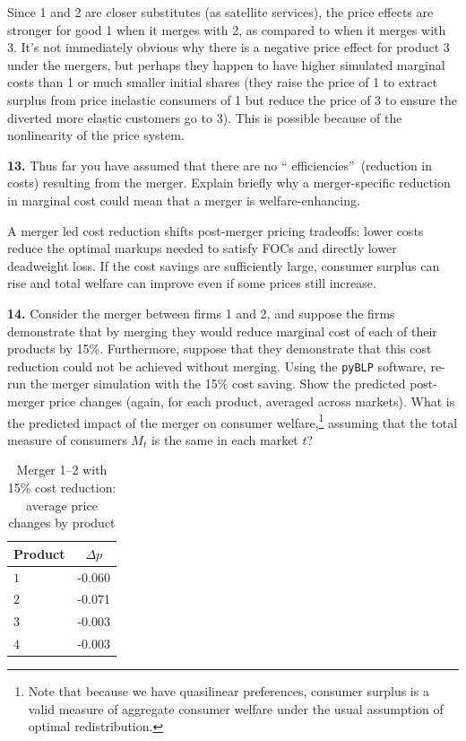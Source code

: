 \documentclass{article}
\begin{document}
Since 1 and 2 are closer substitutes (as satellite services), the price effects are stronger for good 1 when it merges with 2, as compared to when it merges with 3. It's not immediately obvious why there is a negative price effect for product 3 under the mergers, but perhaps they happen to have higher simulated marginal costs than 1 or much smaller initial shares (they raise the price of 1 to extract surplus from price inelastic consumers of 1 but reduce the price of 3 to ensure the diverted more elastic customers go to 3). This is possible because of the nonlinearity of the price system.


\begin{tcolorbox}
\textbf{13.} Thus far you have assumed that there are no \textquotedblleft
efficiencies\textquotedblright\ (reduction in costs) resulting from the
merger. Explain briefly why a merger-specific reduction in marginal cost
could mean that a merger is welfare-enhancing.
\end{tcolorbox}

A merger led cost reduction shifts post-merger pricing tradeoffs: lower costs reduce the optimal markups needed to satisfy FOCs and directly lower deadweight loss. If the cost savings are sufficiently large, consumer surplus can rise and total welfare can improve even if some prices still increase.


\begin{tcolorbox}
\textbf{14.} Consider the merger between firms 1 and 2, and suppose the firms
demonstrate that by merging they would reduce marginal cost of each of their
products by 15\%. Furthermore, suppose that they demonstrate that this cost
reduction could not be achieved without merging.    Using the \texttt{pyBLP} software, re-run the merger simulation
with the 15\% cost saving. Show the predicted post-merger price changes (again,
for each product, averaged across markets). What is the predicted impact of
the merger on consumer welfare,\footnote{%
Note that because we have quasilinear preferences, consumer surplus is a
valid measure of aggregate consumer welfare under the usual assumption of
optimal redistribution.} assuming that the total measure of consumers $%
M_{t} $ is the same in each market  $t$?  
\end{tcolorbox}

\begin{table}[H]
\centering
\caption{Merger 1--2 with 15\% cost reduction: average price changes by product}
\begin{tabular}{lc}
\hline Product & $\Delta p$ \\ \hline
$1$ & -0.060 \\
$2$ & -0.071 \\
$3$ & -0.003 \\
$4$ & -0.003 \\
\hline\end{tabular}\end{table}
\end{document}
